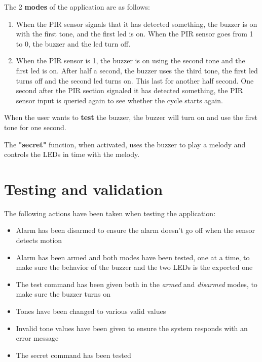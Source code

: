 \documentclass[a4paper,12pt]{report}
\begin{document}
The 2 \textbf{modes} of the application are as follows:

\begin{enumerate}

\item When the PIR sensor signals that it has detected something, the buzzer is on with the first tone, and the first led is on. When the PIR sensor goes from 1 to 0, the buzzer and the led turn off.
\item  When the PIR sensor is 1, the buzzer is on using the second tone and the first led is on. After half a second, the buzzer uses the third tone, the first led turns off and the second led turns on. This last for another half second. One second after the PIR section signaled it has detected something, the PIR sensor input is queried again to see whether the cycle starts again.

\end{enumerate}

\vspace{5mm}

When the user wants to \textbf{test} the buzzer, the buzzer will turn on and use the first tone for one second.

\vspace{5mm}

The \textbf{"secret"} function, when activated, uses the buzzer  to play a melody and controls the LEDs in time with the melody.

\chapter{Testing and validation}

The following actions have been taken when testing the application:

\begin{itemize}

\item Alarm has been disarmed to ensure the alarm doesn't go off when the sensor detects motion
\item Alarm has been armed and both modes have been tested, one at a time, to make sure the behavior of the buzzer and the two LEDs is the expected one
\item The test command has been given both in the \emph{armed} and \emph{disarmed} modes, to make sure the buzzer turns on
\item Tones have been changed to various valid values
\item Invalid tone values have been given to ensure the system responds with an error message
\item The secret command has been tested 


\end{itemize}
\end{document}
